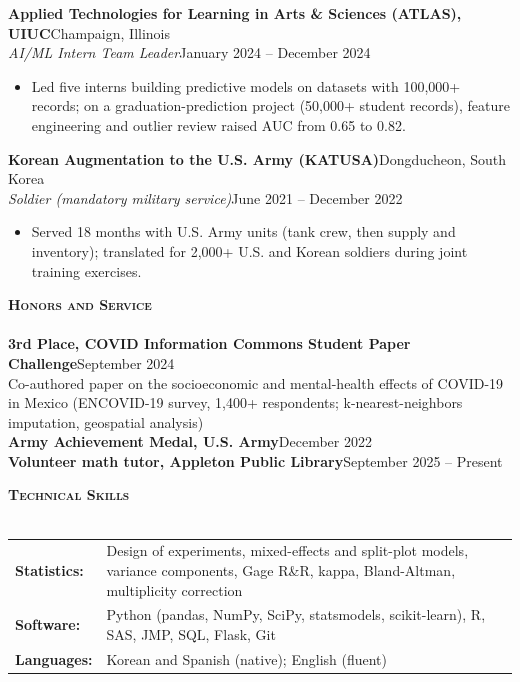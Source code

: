 \documentclass[letterpaper,10pt]{article}
\newcommand{\lineunder}{
    \vspace*{-8pt} \\
    \hspace*{-18pt} \hrulefill \\
}
\newcommand{\header}[1]{
    \Needspace{4\baselineskip}
    {\hspace*{-18pt}\vspace*{4pt} \textsc{#1}}
    \vspace*{-6pt} \lineunder
}
\newcommand{\role}[4]{
    \Needspace{5\baselineskip}
    \vspace{1pt}
    \textbf{#1}\hfill #2\\
    \textit{#3}\hfill #4\\[-3pt]
}
\begin{document}
\role{Applied Technologies for Learning in Arts \& Sciences (ATLAS), UIUC}{Champaign, Illinois}
{AI/ML Intern Team Leader}{January 2024 -- December 2024}
\begin{itemize}
  \item Led five interns building predictive models on datasets with 100,000+ records; on a graduation-prediction project (50,000+ student records), feature engineering and outlier review raised AUC from 0.65 to 0.82.
\end{itemize}

\role{Korean Augmentation to the U.S. Army (KATUSA)}{Dongducheon, South Korea}
{Soldier (mandatory military service)}{June 2021 -- December 2022}
\begin{itemize}
  \item Served 18 months with U.S. Army units (tank crew, then supply and inventory); translated for 2,000+ U.S. and Korean soldiers during joint training exercises.
\end{itemize}

\vspace*{1mm}
\header{\textbf{Honors and Service}}
\textbf{3rd Place, COVID Information Commons Student Paper Challenge}\hfill September 2024\\[-1pt]
Co-authored paper on the socioeconomic and mental-health effects of COVID-19 in Mexico (ENCOVID-19 survey, 1,400+ respondents; k-nearest-neighbors imputation, geospatial analysis)\\[-1pt]
\textbf{Army Achievement Medal, U.S. Army}\hfill December 2022\\[-1pt]
\textbf{Volunteer math tutor, Appleton Public Library}\hfill September 2025 -- Present

\vspace*{1mm}
\header{\textbf{Technical Skills}}
\begin{tabular}{@{}l >{\raggedright\arraybackslash}p{}@{}}
\textbf{Statistics:} & Design of experiments, mixed-effects and split-plot models, variance components, Gage R\&R, kappa, Bland-Altman, multiplicity correction\\
\textbf{Software:} & Python (pandas, NumPy, SciPy, statsmodels, scikit-learn), R, SAS, JMP, SQL, Flask, Git\\
\textbf{Languages:} & Korean and Spanish (native); English (fluent)
\end{tabular}
\end{document}
